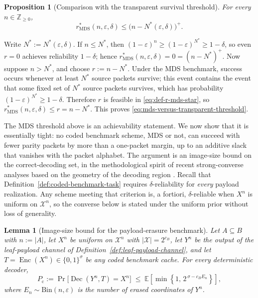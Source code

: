 \documentclass[journal]{IEEEtran}
\makeatletter
\newcommand{\E}{\mathbb{E}}
\newtheorem{lemma}{Lemma}[section]
\newtheorem{proposition}{Proposition}[section]
\numberwithin{equation}{section}
\renewenvironment{proof}[1][\proofname]{\par
  \pushQED{\qed}%
  \normalfont \topsep6\p@\@plus6\p@\relax
  \trivlist
  \item[\hskip\labelsep
        \itshape
    #1\@addpunct{.}]\ignorespaces
}{%
  \popQED\endtrivlist\@endpefalse
}
\DeclareMathOperator{\Enc}{Enc}
\DeclareMathOperator{\Dec}{Dec}
\makeatother
\begin{document}
\begin{proposition}[Comparison with the transparent survival threshold]
\label{prop:mds-versus-transparent-threshold}
For every \(n\in\mathbb Z_{\ge 0}\),
\begin{equation}
  r_{\mathrm{MDS}}^*(n,\varepsilon,\delta)
  \le
  \bigl(n-N^*(\varepsilon,\delta)\bigr)^+.
\label{eq:mds-versus-transparent-threshold}
\end{equation}
\end{proposition}

\begin{proof}
Write \(N^*:=N^*(\varepsilon,\delta)\).
If \(n\le N^*\), then
\((1-\varepsilon)^n\ge(1-\varepsilon)^{N^*}\ge 1-\delta\),
so even \(r=0\) achieves reliability \(1-\delta\); hence
\(r_{\mathrm{MDS}}^*(n,\varepsilon,\delta)=0=(n-N^*)^+\).
Now suppose \(n>N^*\), and choose \(r:=n-N^*\).
Under the MDS benchmark, success occurs whenever at least \(N^*\) source
packets survive; this event contains the event that some fixed set of \(N^*\)
source packets survives, which has probability
\((1-\varepsilon)^{N^*}\ge 1-\delta\).
Therefore \(r\) is feasible in \eqref{eq:def-r-mds-star}, so
\(r_{\mathrm{MDS}}^*(n,\varepsilon,\delta)\le r=n-N^*\).
This proves \eqref{eq:mds-versus-transparent-threshold}.
\end{proof}

The MDS threshold above is an achievability statement.  We now show that it
is essentially tight: no coded benchmark scheme, MDS or not, can succeed
with fewer parity packets by more than a one-packet margin, up to an
additive slack that vanishes with the packet alphabet.  The argument is an
image-size bound on the correct-decoding set, in the methodological spirit
of recent strong-converse analyses based on the geometry of the decoding
region \cite{hamad2024strong,takeuchi2025tight}.  Recall that
Definition~\ref{def:coded-benchmark-task} requires \(\delta\)-reliability
for \emph{every} payload realization.  Any scheme meeting that criterion
is, a fortiori, \(\delta\)-reliable when \(X^n\) is uniform on
\(\mathcal X^n\), so the converse below is stated under the uniform prior
without loss of generality.

\begin{lemma}[Image-size bound for the payload-erasure benchmark]
\label{lem:payload-image-size}
Let \(A\subseteq B\) with \(n:=|A|\), let \(X^n\) be uniform on
\(\mathcal X^n\) with \(|\mathcal X|=2^{c_B}\), let \(Y^n\) be the output of
the leaf-payload channel of Definition~\ref{def:leaf-payload-channel}, and let
\(T=\Enc(X^n)\in\{0,1\}^{\sigma}\) be any coded benchmark cache.  For every
deterministic decoder,
\begin{equation}
  P_{\mathrm c}
  :=
  \Pr\!\bigl[\Dec(Y^n,T)=X^n\bigr]
  \;\le\;
  \E\!\left[
    \min\!\left\{1,\,2^{\,\sigma-c_B E_n}\right\}
  \right],
\label{eq:image-size-bound}
\end{equation}
where \(E_n\sim\mathrm{Bin}(n,\varepsilon)\) is the number of erased
coordinates of \(Y^n\).
\end{lemma}
\end{document}
